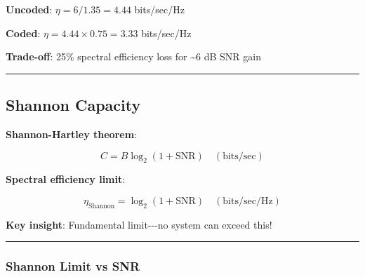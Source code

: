 \textbf{Uncoded}: \(\eta = 6/1.35 = 4.44\) bits/sec/Hz

\textbf{Coded}: \(\eta = 4.44 \times 0.75 = 3.33\) bits/sec/Hz

\textbf{Trade-off}: 25\% spectral efficiency loss for \textasciitilde6
dB SNR gain

\begin{center}\rule{0.5\linewidth}{0.5pt}\end{center}

\subsection{Shannon Capacity}\label{shannon-capacity}

\textbf{Shannon-Hartley theorem}:

\[
C = B \log_2(1 + \text{SNR}) \quad (\text{bits/sec})
\]

\textbf{Spectral efficiency limit}:

\[
\eta_{\text{Shannon}} = \log_2(1 + \text{SNR}) \quad (\text{bits/sec/Hz})
\]

\textbf{Key insight}: Fundamental limit-\/-\/-no system can exceed this!

\begin{center}\rule{0.5\linewidth}{0.5pt}\end{center}

\subsubsection{Shannon Limit vs SNR}\label{shannon-limit-vs-snr}

